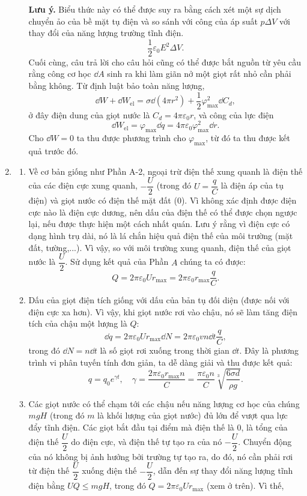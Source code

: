 \begin{loigiai}
\begin{enumerate}[\bf Phần A.]
\begin{enumerate}[1)]
        \textbf{Lưu ý.} Biểu thức này có thể được suy ra bằng cách xét một sự dịch chuyển ảo của bề mặt tụ điện và so sánh với công của áp suất $p \Delta V$ với thay đổi của năng lượng trường tĩnh điện.
        \[\dfrac{1}{2} \varepsilon_{0} E^{2} \Delta V.\]
        Cuối cùng, câu trả lời cho câu hỏi cũng có thể được bắt nguồn từ yêu cầu rằng công cơ học $\dd A$ sinh ra khi làm giãn nở một giọt rất nhỏ cần phải bằng không. Từ định luật bảo toàn năng lượng,
        \[\dd W + \dd W_\text{el}= \sigma \dd\left(4 \pi r^{2}\right) + \dfrac{1}{2} \varphi_{\max }^{2} \dd C_{d},\]
        ở đây điện dung của giọt nước là $C_{{d}}=4 \pi \varepsilon_{0} r$, và công của lực điện
        \[\dd W_\text{el}=\varphi_{\max} \dd q = 4 \pi \varepsilon_{0} \varphi_{\max }^{2} \dd r.\]
        Cho $\dd W=0$ ta thu được phương trình cho $\varphi_{\max }$, từ đó ta thu được kết quả trước đó.
    \end{enumerate}
    \item 
    \begin{enumerate}[1)]
        \item Về cơ bản giống như Phần A-2, ngoại trừ điện thế xung quanh là điện thế của các điện cực xung quanh, $-\dfrac{U}{2}$ (trong đó $U = \dfrac{q}{C}$ là điện áp của tụ điện) và giọt nước có điện thế mặt đất ($0$). Vì không xác định được điện cực nào là điện cực dương, nên dấu của điện thế có thể được chọn ngược lại, nếu được thực hiện một cách nhất quán. Lưu ý rằng vì điện cực có dạng hình trụ dài, nó là lá chắn hiệu quả điện thế của môi trường (mặt đất, tường,...). Vì vậy, so với môi trường xung quanh, điện thế của giọt nước là  $\dfrac{U}{2}$. Sử dụng kết quả của Phần $A$ chúng ta có được:
        \[Q=2 \pi \varepsilon_{0} U r_{\max}=2 \pi \varepsilon_{0} r_{\max } \dfrac{q}{C}.\]
        \item  Dấu của giọt điện tích giống với dấu  của bản tụ đối diện (được nối với điện cực xa hơn). Vì vậy, khi giọt nước rơi vào chậu, nó sẽ làm tăng điện tích của chậu một lượng là $Q$:
        \[\dd q = 2\pi \varepsilon_0 U r_{\max} \dd N =  2\pi \varepsilon_0 v n \dd t  \dfrac{q}{C},\]
        trong đó $\dd N = n \dd t$ là số giọt rơi xuống trong thời gian $\dd t$. Đây là phương trình vi phân tuyến tính đơn giản, ta dễ dàng giải và thu được kết quả:
        \[ q=q_{0} e^{\gamma t}, \quad \gamma = \dfrac{2 \pi \varepsilon_{0} r_{\max} n}{C} = \dfrac{\pi \varepsilon_{0} n}{C} \sqrt[3]{\dfrac{6 \sigma d}{\rho g}}.\]
        \item Các giọt nước có thể chạm tới các chậu nếu năng lượng cơ học của chúng ${mgH}$ (trong đó ${m}$ là khối lượng của giọt nước) đủ lớn để vượt qua lực đẩy tĩnh điện. Các giọt bắt đầu tại điểm mà điện thế là $0$, là tổng của điện thế $\dfrac{U}{2}$ do điện cực, và điện thế tự tạo ra của nó $-\dfrac{U}{2}$. Chuyển động của nó không bị ảnh hưởng bởi trường tự tạo ra, do đó, nó cần phải rơi từ điện thế $\dfrac{U}{2}$ xuống điện thế $-\dfrac{U}{2}$, dẫn đến sự thay đổi năng lượng tĩnh điện bằng $U Q \leq m g H$, trong đó $Q=2 \pi \varepsilon_{0} U r_{\max }$ (xem ở trên). Vì thế,

\end{enumerate}
\end{enumerate}
\end{loigiai}
